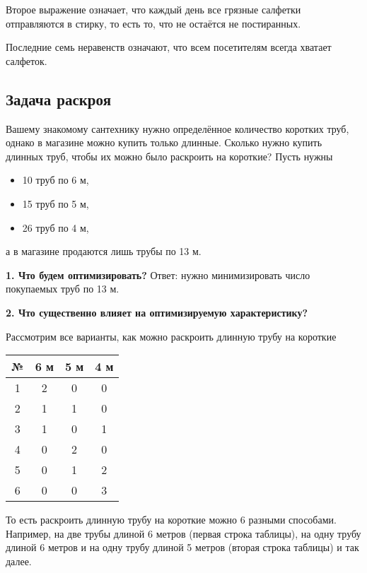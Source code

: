Второе выражение означает, что каждый день все грязные салфетки отправляются в стирку, то есть то, что не остаётся не постиранных.

Последние семь неравенств означают, что всем посетителям всегда хватает салфеток.

\subsection{Задача раскроя}

\problem[раскроя]\label{pr:cutting_stock}

Вашему знакомому сантехнику нужно определённое количество коротких труб, однако в магазине можно купить только длинные. Сколько нужно купить длинных труб, чтобы их можно было раскроить на короткие? Пусть нужны
\begin{itemize}[nosep]
	\item 10 труб по 6 м,
	
	\item 15 труб по 5 м,
	
	\item 26 труб по 4 м,
\end{itemize}

а в магазине продаются лишь трубы по 13 м.

\mathmodel

\textbf{1. Что будем оптимизировать?} Ответ: нужно минимизировать число покупаемых труб по 13 м.

\bigskip

\textbf{2. Что существенно влияет на оптимизируемую характеристику?}

Рассмотрим все варианты, как можно раскроить длинную трубу на короткие

\begin{table}[h!]
	\centering
	\begin{tabular}{| c | c | c | c | } 
		\hline
		№ & 6 м & 5 м & 4 м \\ 
		\hline
		1 & 2 & 0 & 0 \\\hline
		2 & 1 & 1 & 0 \\\hline
		3 & 1 & 0 & 1 \\\hline
		4 & 0 & 2 & 0 \\\hline
		5 & 0 & 1 & 2 \\\hline
		6 & 0 & 0 & 3 \\\hline
	\end{tabular}
\end{table}

То есть раскроить длинную трубу на короткие можно 6 разными способами. Например, на две трубы длиной 6 метров (первая строка таблицы), на одну трубу длиной 6 метров и на одну трубу длиной 5 метров (вторая строка таблицы) и так далее.

